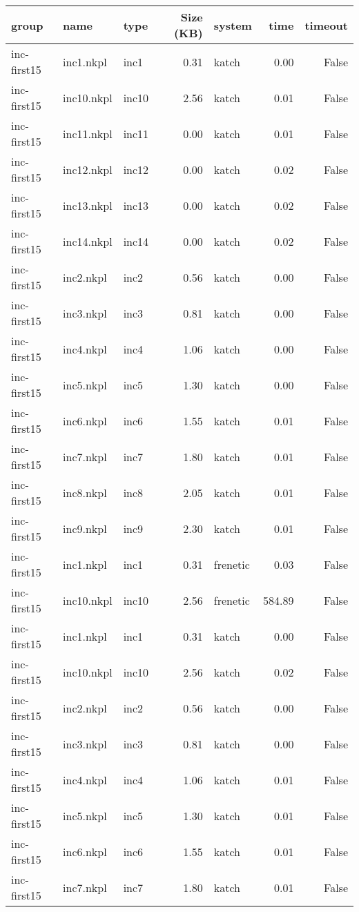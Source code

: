 \begin{tabular}{lllrlrr}
\toprule
group & name & type & Size (KB) & system & time & timeout \\
\midrule
inc-first15 & inc1.nkpl & inc1 & 0.31 & katch & 0.00 & False \\
inc-first15 & inc10.nkpl & inc10 & 2.56 & katch & 0.01 & False \\
inc-first15 & inc11.nkpl & inc11 & 0.00 & katch & 0.01 & False \\
inc-first15 & inc12.nkpl & inc12 & 0.00 & katch & 0.02 & False \\
inc-first15 & inc13.nkpl & inc13 & 0.00 & katch & 0.02 & False \\
inc-first15 & inc14.nkpl & inc14 & 0.00 & katch & 0.02 & False \\
inc-first15 & inc2.nkpl & inc2 & 0.56 & katch & 0.00 & False \\
inc-first15 & inc3.nkpl & inc3 & 0.81 & katch & 0.00 & False \\
inc-first15 & inc4.nkpl & inc4 & 1.06 & katch & 0.00 & False \\
inc-first15 & inc5.nkpl & inc5 & 1.30 & katch & 0.00 & False \\
inc-first15 & inc6.nkpl & inc6 & 1.55 & katch & 0.01 & False \\
inc-first15 & inc7.nkpl & inc7 & 1.80 & katch & 0.01 & False \\
inc-first15 & inc8.nkpl & inc8 & 2.05 & katch & 0.01 & False \\
inc-first15 & inc9.nkpl & inc9 & 2.30 & katch & 0.01 & False \\
inc-first15 & inc1.nkpl & inc1 & 0.31 & frenetic & 0.03 & False \\
inc-first15 & inc10.nkpl & inc10 & 2.56 & frenetic & 584.89 & False \\
inc-first15 & inc1.nkpl & inc1 & 0.31 & katch & 0.00 & False \\
inc-first15 & inc10.nkpl & inc10 & 2.56 & katch & 0.02 & False \\
inc-first15 & inc2.nkpl & inc2 & 0.56 & katch & 0.00 & False \\
inc-first15 & inc3.nkpl & inc3 & 0.81 & katch & 0.00 & False \\
inc-first15 & inc4.nkpl & inc4 & 1.06 & katch & 0.01 & False \\
inc-first15 & inc5.nkpl & inc5 & 1.30 & katch & 0.01 & False \\
inc-first15 & inc6.nkpl & inc6 & 1.55 & katch & 0.01 & False \\
inc-first15 & inc7.nkpl & inc7 & 1.80 & katch & 0.01 & False \\

\end{tabular}
